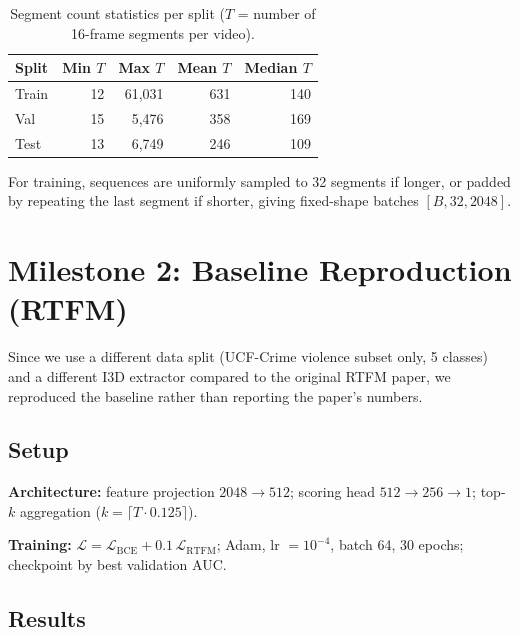 \documentclass[11pt]{article}
\begin{document}
\begin{table}[h]
\centering
\small
\begin{tabular}{lrrrr}
\toprule
\textbf{Split} & \textbf{Min $T$} & \textbf{Max $T$} &
                 \textbf{Mean $T$} & \textbf{Median $T$} \\
\midrule
Train &  12 & 61,031 & 631 & 140 \\
Val   &  15 &  5,476 & 358 & 169 \\
Test  &  13 &  6,749 & 246 & 109 \\
\bottomrule
\end{tabular}
\caption{Segment count statistics per split
         ($T$ = number of 16-frame segments per video).}
\label{tab:feature_stats}
\end{table}

For training, sequences are uniformly sampled to 32 segments if longer, or padded
by repeating the last segment if shorter, giving fixed-shape batches
$[B, 32, 2048]$.

\section{Milestone 2: Baseline Reproduction (RTFM)}

Since we use a different data split (UCF-Crime violence subset only, 5 classes)
and a different I3D extractor compared to the original RTFM paper, we reproduced
the baseline rather than reporting the paper's numbers.

\subsection{Setup}

\textbf{Architecture:} feature projection $2048 \to 512$;
scoring head $512 \to 256 \to 1$;
top-$k$ aggregation ($k = \lceil T \cdot 0.125 \rceil$).

\textbf{Training:}
$\mathcal{L} = \mathcal{L}_\mathrm{BCE} + 0.1\,\mathcal{L}_\mathrm{RTFM}$;
Adam, lr $= 10^{-4}$, batch 64, 30 epochs;
checkpoint by best validation AUC.

\subsection{Results}
\end{document}
